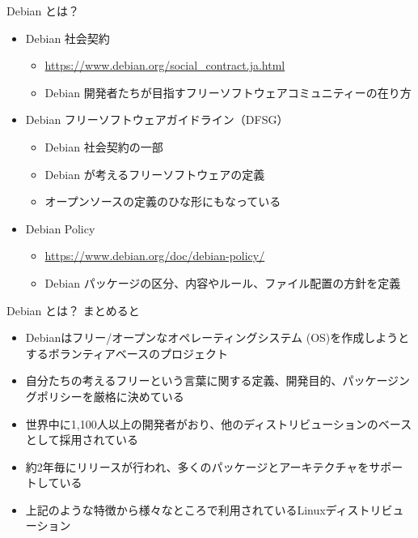 \begin{frame}{Debian とは？}

\begin{itemize}
  \item Debian 社会契約
    \begin{itemize}
      \item \url{https://www.debian.org/social_contract.ja.html}
      \item Debian 開発者たちが目指すフリーソフトウェアコミュニティーの在り方
    \end{itemize}
  \item Debian フリーソフトウェアガイドライン（DFSG）
    \begin{itemize}
      \item Debian 社会契約の一部
      \item Debian が考えるフリーソフトウェアの定義
      \item オープンソースの定義のひな形にもなっている
    \end{itemize}
  \item Debian Policy
    \begin{itemize}
      \item \url{https://www.debian.org/doc/debian-policy/}
      \item Debian パッケージの区分、内容やルール、ファイル配置の方針を定義
    \end{itemize}
\end{itemize}

\end{frame}


\begin{frame}{Debian とは？}
まとめると
\begin{itemize}
  \item Debianはフリー/オープンなオペレーティングシステム (OS)を作成しようとするボランティアベースのプロジェクト
  \item 自分たちの考えるフリーという言葉に関する定義、開発目的、パッケージングポリシーを厳格に決めている
  \item 世界中に1,100人以上の開発者がおり、他のディストリビューションのベースとして採用されている
  \item 約2年毎にリリースが行われ、多くのパッケージとアーキテクチャをサポートしている
  \item 上記のような特徴から様々なところで利用されているLinuxディストリビューション
\end{itemize}

\end{frame}

